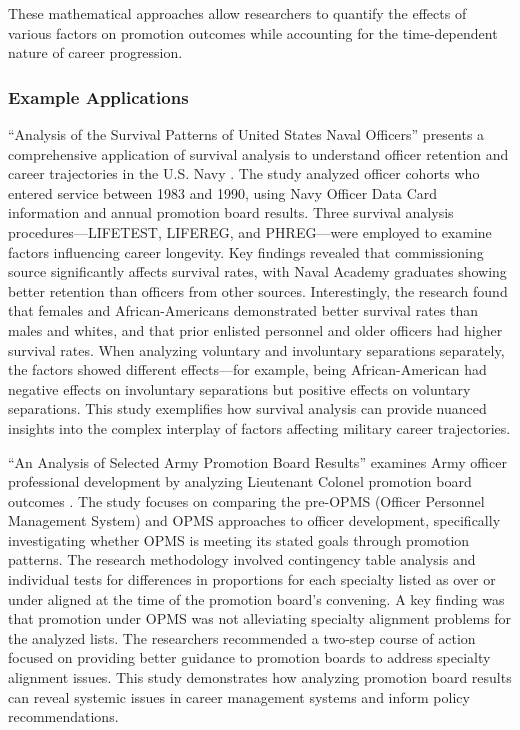 \documentclass[../main.tex]{subfiles}
\begin{document}
These mathematical approaches allow researchers to quantify the effects of various factors on promotion outcomes while accounting for the time-dependent nature of career progression.

\subsubsection{Example Applications}

``Analysis of the Survival Patterns of United States Naval Officers'' presents a comprehensive application of survival analysis to understand officer retention and career trajectories in the U.S. Navy \citep{naval_survival}. The study analyzed officer cohorts who entered service between 1983 and 1990, using Navy Officer Data Card information and annual promotion board results. Three survival analysis procedures—LIFETEST, LIFEREG, and PHREG—were employed to examine factors influencing career longevity. Key findings revealed that commissioning source significantly affects survival rates, with Naval Academy graduates showing better retention than officers from other sources. Interestingly, the research found that females and African-Americans demonstrated better survival rates than males and whites, and that prior enlisted personnel and older officers had higher survival rates. When analyzing voluntary and involuntary separations separately, the factors showed different effects—for example, being African-American had negative effects on involuntary separations but positive effects on voluntary separations. This study exemplifies how survival analysis can provide nuanced insights into the complex interplay of factors affecting military career trajectories.

``An Analysis of Selected Army Promotion Board Results'' examines Army officer professional development by analyzing Lieutenant Colonel promotion board outcomes \citep{army_promotion_analysis}. The study focuses on comparing the pre-OPMS (Officer Personnel Management System) and OPMS approaches to officer development, specifically investigating whether OPMS is meeting its stated goals through promotion patterns. The research methodology involved contingency table analysis and individual tests for differences in proportions for each specialty listed as over or under aligned at the time of the promotion board's convening. A key finding was that promotion under OPMS was not alleviating specialty alignment problems for the analyzed lists. The researchers recommended a two-step course of action focused on providing better guidance to promotion boards to address specialty alignment issues. This study demonstrates how analyzing promotion board results can reveal systemic issues in career management systems and inform policy recommendations.
\end{document}

